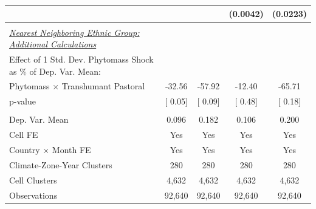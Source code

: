 {\begin{tabular}{l*{4}{c}}
                    &               &               &(0.0042)         &(0.0223)         \\
\midrule
\\ \underline{\emph{Nearest Neighboring Ethnic Group: Additional Calculations}} &               &               &               &               \\
[1em] Effect of 1 Std. Dev. Phytomass Shock as $\%$ of Dep. Var. Mean:&               &               &               &               \\
[1em] \hspace{15pt} Phytomass $\times$ Transhumant Pastoral&-32.56         &-57.92         &-12.40         &-65.71         \\
\hspace{15pt} p-value&[     0.05]         &[     0.09]         &[     0.48]         &[     0.18]         \\
\hline \\ Dep. Var. Mean& 0.096         & 0.182         & 0.106         & 0.200         \\
Cell FE             &   Yes         &   Yes         &   Yes         &   Yes         \\
Country $\times$ Month FE&   Yes         &   Yes         &   Yes         &   Yes         \\
Climate-Zone-Year Clusters&   280         &   280         &   280         &   280         \\
Cell Clusters       & 4,632         & 4,632         & 4,632         & 4,632         \\
Observations        &92,640         &92,640         &92,640         &92,640         \\
\bottomrule
\end{tabular}
}
